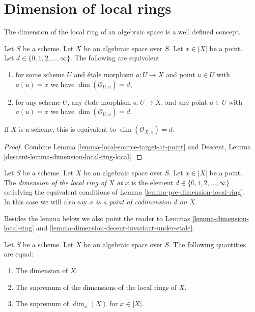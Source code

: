 \section{Dimension of local rings}
\label{section-dimension-local-ring}

\noindent
The dimension of the local ring of an algebraic space is a well defined
concept.

\begin{lemma}
\label{lemma-pre-dimension-local-ring}
Let $S$ be a scheme.
Let $X$ be an algebraic space over $S$.
Let $x \in |X|$ be a point.
Let $d \in \{0, 1, 2, \ldots, \infty\}$.
The following are equivalent
\begin{enumerate}
\item for some scheme $U$ and \'etale morphism $a : U \to X$ and point
$u \in U$ with $a(u) = x$ we have $\dim(\mathcal{O}_{U, u}) = d$,
\item for any scheme $U$, any \'etale morphism $a : U \to X$, and any point
$u \in U$ with $a(u) = x$ we have $\dim(\mathcal{O}_{U, u}) = d$.
\end{enumerate}
If $X$ is a scheme, this is equivalent to $\dim(\mathcal{O}_{X, x}) = d$.
\end{lemma}

\begin{proof}
Combine
Lemma \ref{lemma-local-source-target-at-point} and
Descent, Lemma \ref{descent-lemma-dimension-local-ring-local}.
\end{proof}

\begin{definition}
\label{definition-dimension-local-ring}
Let $S$ be a scheme. Let $X$ be an algebraic space over $S$. Let $x \in |X|$
be a point. The {\it dimension of the local ring of $X$ at $x$} is
the element $d \in \{0, 1, 2, \ldots, \infty\}$ satisfying the equivalent
conditions of Lemma \ref{lemma-pre-dimension-local-ring}. In this case we
will also say {\it $x$ is a point of codimension $d$ on $X$}.
\end{definition}

\noindent
Besides the lemma below we also point the reader to
Lemmas \ref{lemma-dimension-local-ring} and
\ref{lemma-dimension-decent-invariant-under-etale}.

\begin{lemma}
\label{lemma-dimension}
Let $S$ be a scheme. Let $X$ be an algebraic space over $S$.
The following quantities are equal:
\begin{enumerate}
\item The dimension of $X$.
\item The supremum of the dimensions of the local rings of $X$.
\item The supremum of $\dim_x(X)$ for $x \in |X|$.
\end{enumerate}
\end{lemma}


